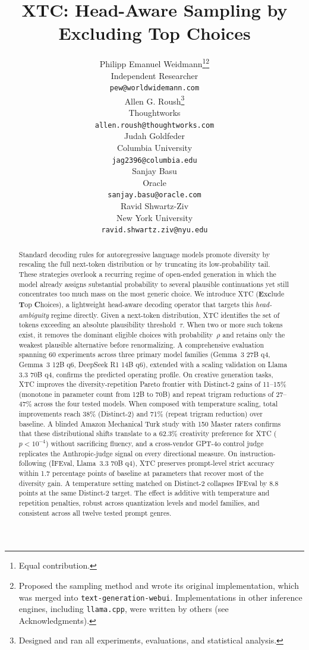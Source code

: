 \documentclass{article}
\title{XTC: Head-Aware Sampling by Excluding Top Choices}
\author{%
  Philipp Emanuel Weidmann\thanks{Equal contribution.}\thanks{Proposed the \xtc{} sampling method and wrote its original implementation, which was merged into \texttt{text-generation-webui}. Implementations in other inference engines, including \texttt{llama.cpp}, were written by others (see Acknowledgments).} \\
  Independent Researcher \\
  \texttt{pew@worldwidemann.com} \\
  \And
  Allen G. Roush\footnotemark[1]\thanks{Designed and ran all experiments, evaluations, and statistical analysis.} \\
  Thoughtworks \\
  \texttt{allen.roush@thoughtworks.com} \\
  \AND
  Judah Goldfeder \\
  Columbia University \\
  \texttt{jag2396@columbia.edu} \\
  \And
  Sanjay Basu \\
  Oracle \\
  \texttt{sanjay.basu@oracle.com} \\
  \And
  Ravid Shwartz-Ziv \\
  New York University \\
  \texttt{ravid.shwartz.ziv@nyu.edu} \\
}
\newcommand{\xtc}{\textsc{XTC}}
\begin{document}
\maketitle

\begin{abstract}
Standard decoding rules for autoregressive language models promote diversity by rescaling the full next-token distribution or by truncating its low-probability tail.
These strategies overlook a recurring regime of open-ended generation in which the model already assigns substantial probability to several plausible continuations yet still concentrates too much mass on the most generic choice.
We introduce \xtc{} (\textbf{E}x\textbf{c}lude \textbf{T}op \textbf{C}hoices), a lightweight head-aware decoding operator that targets this \emph{head-ambiguity} regime directly.
Given a next-token distribution, \xtc{} identifies the set of tokens exceeding an absolute plausibility threshold~$\tau$.
When two or more such tokens exist, it removes the dominant eligible choices with probability~$\rho$ and retains only the weakest plausible alternative before renormalizing.
A comprehensive evaluation spanning 60 experiments across three primary model families (Gemma~3 27B q4, Gemma~3 12B q6, DeepSeek R1 14B q6), extended with a scaling validation on Llama 3.3 70B q4, confirms the predicted operating profile.
On creative generation tasks, \xtc{} improves the diversity-repetition Pareto frontier with Distinct-2 gains of 11--15\% (monotone in parameter count from 12B to 70B) and repeat trigram reductions of 27--47\% across the four tested models.
When composed with temperature scaling, total improvements reach 38\% (Distinct-2) and 71\% (repeat trigram reduction) over baseline.
A blinded Amazon Mechanical Turk study with 150 Master raters confirms that these distributional shifts translate to a 62.3\% creativity preference for \xtc{} ($p<10^{-4}$) without sacrificing fluency, and a cross-vendor GPT-4o control judge replicates the Anthropic-judge signal on every directional measure.
On instruction-following (IFEval, Llama~3.3 70B q4), \xtc{} preserves prompt-level strict accuracy within 1.7 percentage points of baseline at parameters that recover most of the diversity gain. A temperature setting matched on Distinct-2 collapses IFEval by 8.8 points at the same Distinct-2 target.
The effect is additive with temperature and repetition penalties, robust across quantization levels and model families, and consistent across all twelve tested prompt genres.
\end{abstract}
\end{document}
